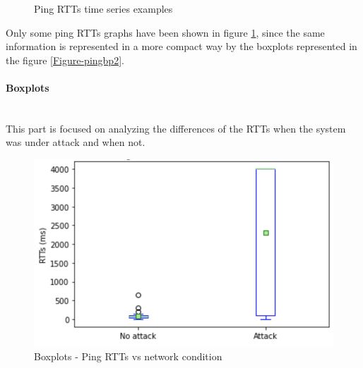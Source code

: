 \documentclass[fleqn, 11pt]{SelfArx} %
\begin{document}
\begin{figure}
    \centering
    \qquad
    \caption{Ping RTTs time series examples}%
    \label{fig:rtts-time-series}%
\end{figure}
Only some ping RTTs graphs have been shown in figure \ref*{fig:rtts-time-series}, since the same information is represented in a more compact way by the boxplots represented in the figure \ref{Figure-pingbp2}.
\paragraph{Boxplots}\mbox{}\\
This part is focused on analyzing the differences of the RTTs when the system was under attack and when not.

\begin{figure}[H]\centering
    \includegraphics[width=\linewidth]{./ping/ping-boxplot1.png}
    \caption{Boxplots - Ping RTTs vs network condition}
\end{figure}
\end{document}

